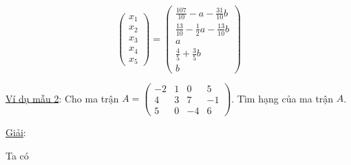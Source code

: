 \documentclass[12pt,a4paper]{article} \usepackage[utf8]{inputenc} \usepackage[T5]{fontenc} \usepackage[vietnamese]{babel} \usepackage{amsmath, amssymb, amsfonts} \usepackage{ulem}
\begin{document}
$$
\begin{pmatrix} x_1 \\ x_2 \\ x_3 \\ x_4 \\ x_5 \end{pmatrix} = \begin{pmatrix} \frac{107}{10} - a - \frac{31}{10}b \\ \frac{13}{10} - \frac{1}{2}a - \frac{13}{10}b \\ a \\ \frac{4}{5} + \frac{3}{5}b \\ b \end{pmatrix}
$$

\ul{Ví dụ mẫu 2}: Cho ma trận
$A = \begin{pmatrix} -2 & 1 & 0 & 5 \\ 4 & 3 & 7 & -1 \\ 5 & 0 & -4 & 6 \end{pmatrix}$. Tìm hạng của
ma trận $A$.

\ul{Giải}:

Ta có
\end{document}
